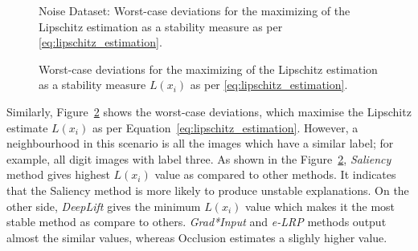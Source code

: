 \documentclass[english]{tktltiki2}
\theoremstyle{definition}
\theoremstyle{remark}
\begin{document}
\begin{figure}[H]
	\centering
	\qquad
	\qquad
	\qquad
	\qquad
	\caption{Noise Dataset: Worst-case deviations for the maximizing of the Lipschitz estimation as a stability measure as per \eqref{eq:lipschitz_estimation}.}%
	\label{fig:digit3_noise_deviations}%
\end{figure}

\begin{figure}[H]
	\vspace*{-5mm}
	\centering
	\qquad
	\qquad
	\qquad
	\qquad
	\caption{Worst-case deviations for the maximizing of the Lipschitz estimation as a stability measure $L(x_i)$ as per \eqref{eq:lipschitz_estimation}.}%
	\label{fig:digit3_deviations}%
\end{figure}

Similarly, Figure~\ref{fig:digit3_deviations} shows the worst-case deviations, which maximise the Lipschitz estimate $L(x_i)$ as per Equation~\eqref{eq:lipschitz_estimation}. However, a neighbourhood in this scenario is all the images which have a similar label; for example, all digit images with label three. As shown in the Figure~\ref{fig:digit3_deviations}, \textit{Saliency} method gives highest $L(x_i)$ value as compared to other methods. It indicates that the Saliency method is more likely to produce unstable explanations. On the other side, \textit{DeepLift} gives the minimum $L(x_i)$ value which makes it the most stable method as compare to others. \textit{Grad*Input} and \textit{e-LRP} methods output almost the similar values, whereas Occlusion estimates a slighly higher value.
\end{document}
